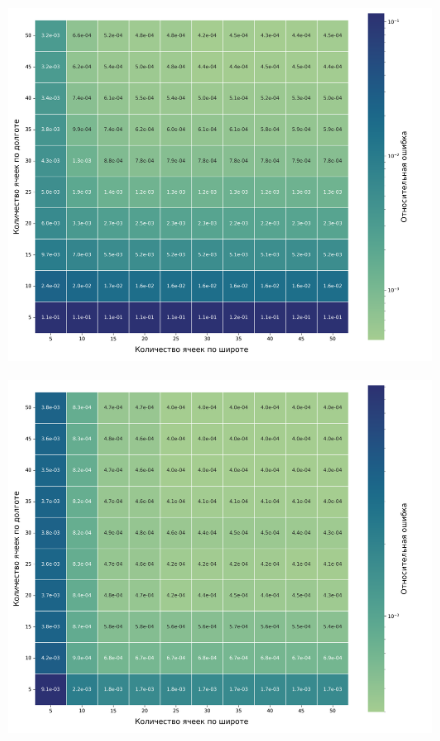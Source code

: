  \begin{figure}[h!]
    \centering
    \includegraphics[width=0.85\linewidth]{../images/solution/atmo/2537_heatmap.png}
    \label{fig:atmo:2537_heatmap}
 \end{figure}

 \begin{figure}[h!]
    \centering
    \includegraphics[width=0.85\linewidth]{../images/solution/atmo/2573_heatmap.png}
    \label{fig:atmo:2573_heatmap}
 \end{figure}

